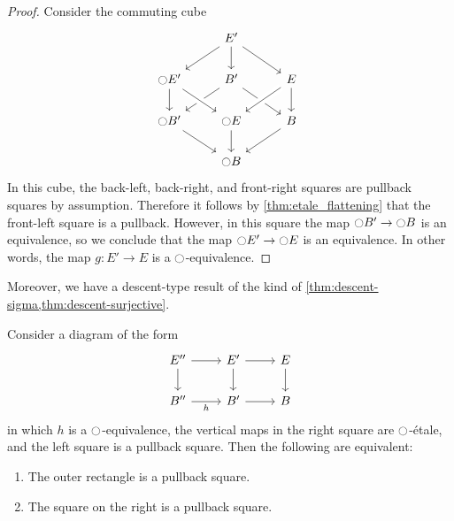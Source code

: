 \documentclass[9pt,twosided]{amsart}
\begin{document}
\begin{proof}
  Consider the commuting cube
  \begin{equation*}
    \begin{tikzcd}
      \phantom{\modal B} & E' \arrow[dl] \arrow[d] \arrow[dr] & \phantom{\modal B} \\
      \modal E' \arrow[d] & B' \arrow[dl] \arrow[dr] & E \arrow[d] \arrow[dl,crossing over] \\
      \modal B' \arrow[dr] & \modal E \arrow[from=ul,crossing over] \arrow[d] & B \arrow[dl] \\
      & \modal B
    \end{tikzcd}
  \end{equation*}
  In this cube, the back-left, back-right, and front-right squares are pullback squares by assumption. Therefore it follows by \cref{thm:etale_flattening} that the front-left square is a pullback. However, in this square the map ${\ocircle} B'\to {\ensuremath{\ocircle}} B$ is an equivalence, so we conclude that the map ${\ocircle} E'\to {\ensuremath{\ocircle}} E$ is an equivalence. In other words, the map $g:E'\to E$ is a ${\ocircle}$-equivalence.
\end{proof}

  Moreover, we have a descent-type result of the kind of \cref{thm:descent-sigma,thm:descent-surjective}.

  \begin{thm}
    Consider a diagram of the form
    \begin{equation*}
      \begin{tikzcd}
        E'' \arrow[d] \arrow[r] & E' \arrow[d] \arrow[r] & E \arrow[d] \\
        B'' \arrow[r,swap,"h"] & B' \arrow[r] & B
      \end{tikzcd}
    \end{equation*}
    in which $h$ is a ${\ocircle}$-equivalence, the vertical maps in the right square are ${\ocircle}$-\'etale, and the left square is a pullback square. Then the following are equivalent:
    \begin{enumerate}
    \item The outer rectangle is a pullback square.
    \item The square on the right is a pullback square.
    \end{enumerate}
  \end{thm}
\end{document}
